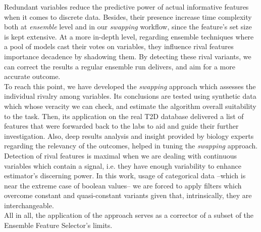 Redundant variables reduce the predictive power of actual informative features when it comes to discrete data. Besides, their presence increase time complexity both at \emph{ensemble} level and in our \emph{swapping} workflow, since the feature's set size is kept extensive. At a more in-depth level, regarding ensemble techniques where a pool of models cast their votes on variables, they influence rival features importance decadence by shadowing them. By detecting these rival variants, we can correct the results a regular ensemble run delivers, and aim for a more accurate outcome.
\\

To reach this point, we have developed the \emph{swapping} approach which assesses the individual rivalry among variables. Its conclusions are tested using synthetic data which whose veracity we can check, and estimate the algorithm overall suitability to the task. Then, its application on the real T2D database delivered a list of features that were forwarded back to the labs to aid and guide their further investigation. Also, deep results analysis and insight provided by biology experts regarding the relevancy of the outcomes, helped in tuning the \emph{swapping} approach.
\\

Detection of rival features is maximal when we are dealing with continuous variables which contain a signal, i.e. they have enough variability to enhance estimator's discerning power. In this work, usage of categorical data --which is near the extreme case of boolean values-- we are forced to apply filters which overcome constant and quasi-constant variants given that, intrinsically, they are interchangeable.
\\

All in all, the application of the approach serves as a corrector of a subset of the Ensemble Feature Selector's limits.



